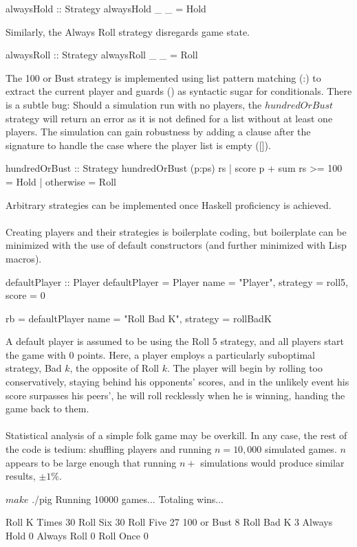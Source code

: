 \documentclass{article}
\begin{document}
\begin{verbatimtab}
alwaysHold :: Strategy
alwaysHold _ _ = Hold
\end{verbatimtab}
Similarly, the Always Roll strategy disregards game state.
\begin{verbatimtab}
alwaysRoll :: Strategy
alwaysRoll _ _ = Roll
\end{verbatimtab}
The 100 or Bust strategy is implemented using list pattern matching (:) to extract the current player and guards (\textbar) as syntactic sugar for conditionals. There is a subtle bug: Should a simulation run with no players, the $hundredOrBust$ strategy will return an error as it is not defined for a list without at least one players. The simulation can gain robustness by adding a clause after the signature to handle the case where the player list is empty ([]).
\begin{verbatimtab}
hundredOrBust :: Strategy
hundredOrBust (p:ps) rs
	| score p + sum rs >= 100 = Hold
	| otherwise = Roll
\end{verbatimtab}
Arbitrary strategies can be implemented once Haskell proficiency is achieved.
\\\\
Creating players and their strategies is boilerplate coding, but boilerplate can be minimized with the use of default constructors (and further minimized with Lisp macros).
\begin{verbatimtab}
defaultPlayer :: Player
defaultPlayer = Player {
		name = "Player",
		strategy = roll5,
		score = 0
	}

rb = defaultPlayer { name = "Roll Bad K", strategy = rollBadK }
\end{verbatimtab}
A default player is assumed to be using the Roll 5 strategy, and all players start the game with 0 points. Here, a player employs a particularly suboptimal strategy, Bad $k$, the opposite of Roll $k$. The player will begin by rolling too conservatively, staying behind his opponents' scores, and in the unlikely event his score surpasses his peers', he will roll recklessly when he is winning, handing the game back to them.
\\\\
Statistical analysis of a simple folk game may be overkill. In any case, the rest of the code is tedium: shuffling players and running $n = 10,000$ simulated games. $n$ appears to be large enough that running $n+$ simulations would produce similar results, $\pm 1\%$.
\begin{verbatimtab}
$ make
$ ./pig
Running 10000 games...
Totaling wins...

Roll K Times	30%
Roll Six	30%
Roll Five	27%
100 or Bust	8%
Roll Bad K	3%
Always Hold	0%
Always Roll	0%
Roll Once	0%
\end{verbatimtab}
\end{document}
